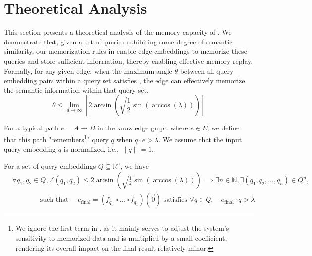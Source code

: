 \section{Theoretical Analysis}
\label{appendix:theoretical-analysis}

This section presents a theoretical analysis of the memory capacity of \ours. We demonstrate that, given a set of queries exhibiting some degree of semantic similarity, our memorization rules in  enable edge embeddings to memorize these queries and store sufficient information, thereby enabling effective memory replay. Formally, for any given edge, when the maximum angle $\theta$ between all query embedding pairs within a query set satisfies , the edge can effectively memorize the semantic information within that query set. 
\begin{equation}
    \theta \leq \lim_{d \to \infty} \left[ 2\arcsin\left(\sqrt{\frac{1}{2}}\sin(\arccos(\lambda))\right) \right]
\label{eq:lamba-theta2}
\end{equation}


\begin{assumption}
For a typical path $e = A \rightarrow B$ in the knowledge graph where $e \in E$, we define that this path "remembers\footnote{We ignore the first term in , as it mainly serves to adjust the system's sensitivity to memorized data and is multiplied by a small coefficient, rendering its overall impact on the final result relatively minor.}" query $q$ when $q \cdot e > \lambda$.
We assume that the input query embedding $q$ is normalized, i.e., $\|q\| = 1$.
\end{assumption}

\begin{proposition}
For a set of query embeddings $Q\subseteq \mathbb{R}^n$, we have
\begin{align*}
&\forall q_1, q_2 \in Q, \angle(q_1, q_2) \leq 2\arcsin\left(\sqrt{\frac{1}{2}}\sin(\arccos(\lambda))\right) \implies \exists n \in \mathbb{N}, \exists (q_1, q_2, \dots, q_n) \in Q^n, \\
&\quad\quad\quad\quad \text{such that }\quad e_{\text{final}} = (f_{q_n} \circ \dots \circ f_{q_1})(\vec{0}) 
\text{ satisfies } \forall q \in Q,\quad e_{\text{final}} \cdot q > \lambda
\end{align*}
\end{proposition}


